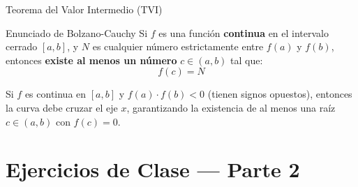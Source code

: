 \documentclass[aspectratio=169]{beamer}
\begin{document}
\begin{frame}{Teorema del Valor Intermedio (TVI)}
  \begin{block}{Enunciado de Bolzano-Cauchy}
    Si $f$ es una función \textbf{continua} en el intervalo cerrado $[a, b]$, y $N$ es cualquier número estrictamente entre $f(a)$ y $f(b)$, entonces \textbf{existe al menos un número} $c \in (a, b)$ tal que:
    $$\boxed{f(c) = N}$$
  \end{block}

  \vspace{4pt}
  \begin{mwextra}
    Si $f$ es continua en $[a, b]$ y $f(a) \cdot f(b) < 0$ (tienen signos opuestos), entonces la curva debe cruzar el eje $x$, garantizando la existencia de al menos una raíz $c \in (a, b)$ con $f(c) = 0$.
  \end{mwextra}
\end{frame}



\section{Ejercicios de Clase — Parte 2}
\end{document}
